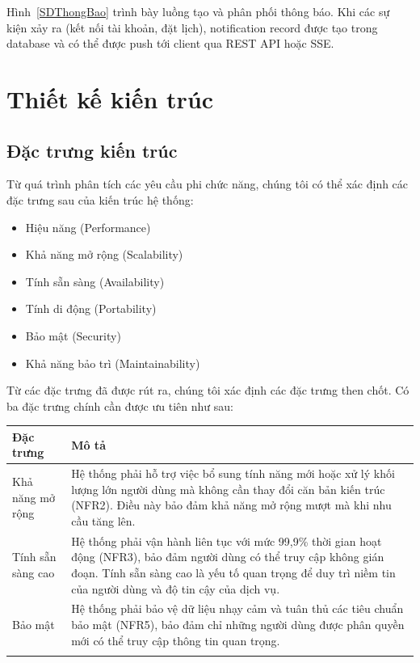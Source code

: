 Hình~\ref{SDThongBao} trình bày luồng tạo và phân phối thông báo. Khi các sự kiện xảy ra (kết nối tài khoản, đặt lịch), notification record được tạo trong database và có thể được push tới client qua REST API hoặc SSE.

\section{Thiết kế kiến trúc}
\subsection{Đặc trưng kiến trúc}
Từ quá trình phân tích các yêu cầu phi chức năng, chúng tôi có thể xác định các đặc trưng sau của kiến trúc hệ thống:
\begin{itemize}
  \item Hiệu năng (Performance)
  \item Khả năng mở rộng (Scalability)
  \item Tính sẵn sàng (Availability)
  \item Tính di động (Portability)
  \item Bảo mật (Security)
  \item Khả năng bảo trì (Maintainability)
\end{itemize}

Từ các đặc trưng đã được rút ra, chúng tôi xác định các đặc trưng then chốt. Có ba đặc trưng chính cần được ưu tiên như sau:


{\scriptsize
\setlength{\tabcolsep}{4pt}
\renewcommand{\arraystretch}{1.5}
\begin{tabularx}{\textwidth}{|>{\centering\arraybackslash}m{3cm}|>{\arraybackslash}X|}
\hline
\textbf{Đặc trưng} & \textbf{Mô tả} \\ \hline
Khả năng mở rộng & Hệ thống phải hỗ trợ việc bổ sung tính năng mới hoặc xử lý khối lượng lớn người dùng mà không cần thay đổi căn bản kiến trúc (NFR2). Điều này bảo đảm khả năng mở rộng mượt mà khi nhu cầu tăng lên. \\ \hline
Tính sẵn sàng cao & Hệ thống phải vận hành liên tục với mức 99,9\% thời gian hoạt động (NFR3), bảo đảm người dùng có thể truy cập không gián đoạn. Tính sẵn sàng cao là yếu tố quan trọng để duy trì niềm tin của người dùng và độ tin cậy của dịch vụ. \\ \hline
Bảo mật & Hệ thống phải bảo vệ dữ liệu nhạy cảm và tuân thủ các tiêu chuẩn bảo mật (NFR5), bảo đảm chỉ những người dùng được phân quyền mới có thể truy cập thông tin quan trọng. \\ \hline
\caption{Các đặc trưng then chốt}
\end{tabularx}}



